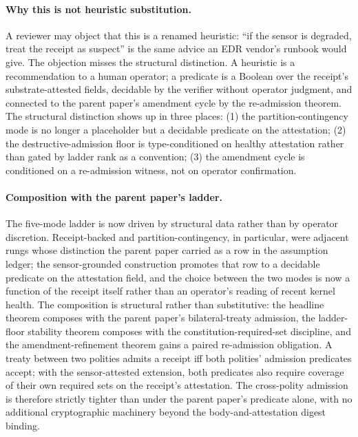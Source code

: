 \paragraph{Why this is not heuristic substitution.}
A reviewer may object that this is a renamed heuristic: ``if the sensor is degraded, treat the receipt as suspect'' is the same advice an EDR vendor's runbook would give. The objection misses the structural distinction. A heuristic is a recommendation to a human operator; a predicate is a Boolean over the receipt's substrate-attested fields, decidable by the verifier without operator judgment, and connected to the parent paper's amendment cycle by the re-admission theorem. The structural distinction shows up in three places: (1) the partition-contingency mode is no longer a placeholder but a decidable predicate on the attestation; (2) the destructive-admission floor is type-conditioned on healthy attestation rather than gated by ladder rank as a convention; (3) the amendment cycle is conditioned on a re-admission witness, not on operator confirmation.

\paragraph{Composition with the parent paper's ladder.}
The five-mode ladder is now driven by structural data rather than by operator discretion. Receipt-backed and partition-contingency, in particular, were adjacent rungs whose distinction the parent paper carried as a row in the assumption ledger; the sensor-grounded construction promotes that row to a decidable predicate on the attestation field, and the choice between the two modes is now a function of the receipt itself rather than an operator's reading of recent kernel health. The composition is structural rather than substitutive: the headline theorem composes with the parent paper's bilateral-treaty admission, the ladder-floor stability theorem composes with the constitution-required-set discipline, and the amendment-refinement theorem gains a paired re-admission obligation. A treaty between two polities admits a receipt iff both polities' admission predicates accept; with the sensor-attested extension, both predicates also require coverage of their own required sets on the receipt's attestation. The cross-polity admission is therefore strictly tighter than under the parent paper's predicate alone, with no additional cryptographic machinery beyond the body-and-attestation digest binding.

